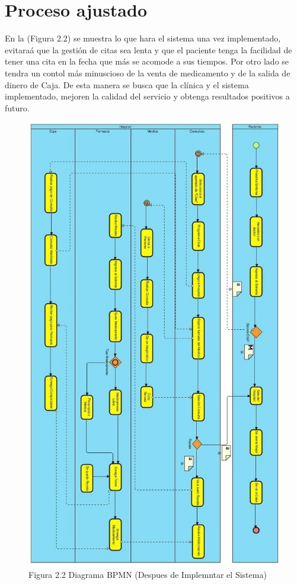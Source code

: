 \section{Proceso ajustado}
	En la (Figura 2.2) se muestra lo que hara el sistema una vez implementado, evitara\'a que la gesti\'on de citas sea lenta y que el paciente tenga la facilidad de tener una cita en la fecha que m\'as se acomode a sus tiempos. Por otro lado se tendra un contol m\'as minuscioso de la venta de medicamento y de la salida de dinero de Caja. De esta manera se busca que la cl\'inica y el sistema implementado, mejoren la calidad del servicio y obtenga resultados positivos a futuro.
	
\begin{figure}[htbp!]
\centering
		\includegraphics[width=.7\textwidth]{images/diagramabpm}
		\caption{Figura 2.2 Diagrama BPMN (Despues de Implemntar el Sistema)}
	\end{figure}

\newpage

